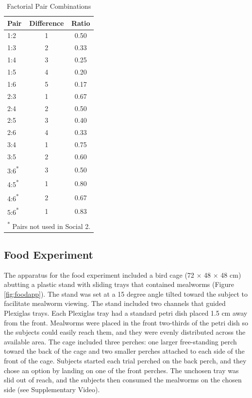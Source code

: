 \documentclass[
  ,pub,floatsintext]{apa6}
\begin{document}
\begin{table}[!h]

\caption{\label{tab:pairstablelatex}Factorial Pair Combinations}
\centering
\begin{tabular}[t]{lcc}
\toprule
Pair & Difference & Ratio\\
\midrule
1:2 & 1 & 0.50\\
1:3 & 2 & 0.33\\
1:4 & 3 & 0.25\\
1:5 & 4 & 0.20\\
1:6 & 5 & 0.17\\
2:3 & 1 & 0.67\\
2:4 & 2 & 0.50\\
2:5 & 3 & 0.40\\
2:6 & 4 & 0.33\\
3:4 & 1 & 0.75\\
3:5 & 2 & 0.60\\
3:6\textsuperscript{*} & 3 & 0.50\\
4:5\textsuperscript{*} & 1 & 0.80\\
4:6\textsuperscript{*} & 2 & 0.67\\
5:6\textsuperscript{*} & 1 & 0.83\\
\bottomrule
\multicolumn{3}{l}{\rule{0pt}{1em}\textsuperscript{*} Pairs not used in Social 2.}\\
\end{tabular}
\end{table}

\hypertarget{food-experiment}{%
\subsection{Food Experiment}\label{food-experiment}}

The apparatus for the food experiment included a bird cage (72 \(\times\) 48 \(\times\) 48 cm) abutting a plastic stand with sliding trays that contained mealworms (Figure \ref{fig:foodapp}). The stand was set at a 15 degree angle tilted toward the subject to facilitate mealworm viewing. The stand included two channels that guided Plexiglas trays. Each Plexiglas tray had a standard petri dish placed 1.5 cm away from the front. Mealworms were placed in the front two-thirds of the petri dish so the subjects could easily reach them, and they were evenly distributed across the available area. The cage included three perches: one larger free-standing perch toward the back of the cage and two smaller perches attached to each side of the front of the cage. Subjects started each trial perched on the back perch, and they chose an option by landing on one of the front perches. The unchosen tray was slid out of reach, and the subjects then consumed the mealworms on the chosen side (see Supplementary Video).
\end{document}
